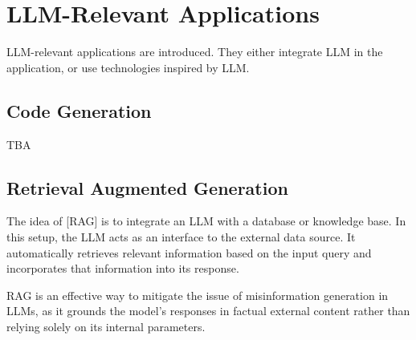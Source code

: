 \chapter{LLM-Relevant Applications}

LLM-relevant applications are introduced. They either integrate LLM in the application, or use technologies inspired by LLM.

\section{Code Generation}

TBA

\section{Retrieval Augmented Generation}

The idea of [RAG] is to integrate an LLM with a database or knowledge base. In this setup, the LLM acts as an interface to the external data source. It automatically retrieves relevant information based on the input query and incorporates that information into its response. 

RAG is an effective way to mitigate the issue of misinformation generation in LLMs, as it grounds the model's responses in factual external content rather than relying solely on its internal parameters.
